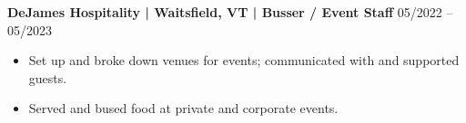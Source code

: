 \noindent
\textbf{DeJames Hospitality | Waitsfield, VT | Busser / Event Staff} \hfill 05/2022 -- 05/2023
\begin{itemize}
    \item Set up and broke down venues for events; communicated with and supported guests.
    \item Served and bused food at private and corporate events.
\end{itemize}
